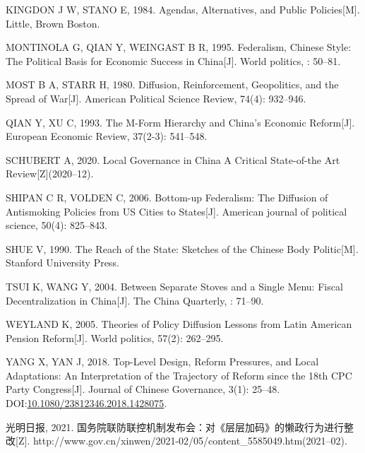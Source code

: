 \documentclass[
  12pt,
]{ctexart}
\newlength{\cslhangindent}
\newlength{\cslentryspacingunit} %
\newenvironment{CSLReferences}[2] %
 {%
  \setlength{\parindent}{0pt}
  \ifodd #1
  \let\oldpar\par
  \def\par{\hangindent=\cslhangindent\oldpar}
  \fi
  \setlength{\parskip}{#2\cslentryspacingunit}
 }%
 {}
\begin{document}
\begin{CSLReferences}{1}{0}
\leavevmode{}%
KINGDON J W, STANO E, 1984. Agendas, Alternatives, and Public Policies{[}M{]}. {Little, Brown Boston}.

\leavevmode{}%
MONTINOLA G, QIAN Y, WEINGAST B R, 1995. Federalism, {Chinese} Style: The Political Basis for Economic Success in {China}{[}J{]}. World politics, : 50--81.

\leavevmode{}%
MOST B A, STARR H, 1980. Diffusion, Reinforcement, Geopolitics, and the Spread of War{[}J{]}. American Political Science Review, 74(4): 932--946.

\leavevmode{}%
QIAN Y, XU C, 1993. The {M}-Form Hierarchy and {China}'s Economic Reform{[}J{]}. European Economic Review, 37(2-3): 541--548.

\leavevmode{}%
SCHUBERT A, 2020. Local {Governance} in {China} \textendash{} {A Critical State}-of-the {Art Review}{[}Z{]}(2020--12).

\leavevmode{}%
SHIPAN C R, VOLDEN C, 2006. Bottom-up Federalism: The Diffusion of Antismoking Policies from {US} Cities to States{[}J{]}. American journal of political science, 50(4): 825--843.

\leavevmode{}%
SHUE V, 1990. The Reach of the State: Sketches of the {Chinese} Body Politic{[}M{]}. {Stanford University Press}.

\leavevmode{}%
TSUI K, WANG Y, 2004. Between Separate Stoves and a Single Menu: Fiscal Decentralization in {China}{[}J{]}. The China Quarterly, : 71--90.

\leavevmode{}%
WEYLAND K, 2005. Theories of Policy Diffusion Lessons from {Latin American} Pension Reform{[}J{]}. World politics, 57(2): 262--295.

\leavevmode{}%
YANG X, YAN J, 2018. Top-Level Design, Reform Pressures, and Local Adaptations: An Interpretation of the Trajectory of Reform since the 18th {CPC Party Congress}{[}J{]}. Journal of Chinese Governance, 3(1): 25--48. DOI:\href{https://doi.org/10.1080/23812346.2018.1428075}{10.1080/23812346.2018.1428075}.

\leavevmode{}%
光明日报, 2021. 国务院联防联控机制发布会：对{《层层加码》}的懒政行为进行整改{[}Z{]}. http://www.gov.cn/xinwen/2021-02/05/content\_5585049.htm(2021--02).


\end{CSLReferences}
\end{document}
